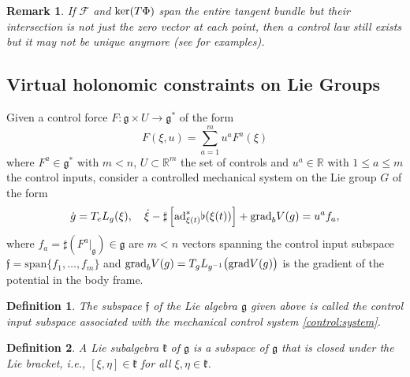 \documentclass[letterpaper, 10 pt, conference]{ieeeconf}
\newtheorem{definition}{Definition}
\newtheorem{remark}{Remark}
\newcommand{\g}{\mathfrak{g}}
\newcommand{\grad}{\normalfont{\text{grad}}}
\begin{document}
\begin{remark}
    If $\mathcal{F}$ and $\hbox{ker}(T\Phi)$ span the entire tangent bundle but their intersection is not just the zero vector at each point, then a control law still exists but it may not be unique anymore (see \cite{simoes2023virtual} for examples).
\end{remark}



\subsection{Virtual holonomic constraints on Lie Groups}\label{vclg}




Given a control force $F:\mathfrak{g}\times U \rightarrow \mathfrak{g}^{*}$ of the form
\begin{equation}\label{control:force:general}
    F(\xi,u) = \sum_{a=1}^{m} u^{a}F^{a}(\xi)
\end{equation}
where $F^{a}\in\mathfrak{g}^{*}$ with $m<n$, $U\subset\mathbb{R}^{m}$ the set of controls and $u^a\in\mathbb{R}$ with $1\leq a\leq m$ the control inputs, consider a controlled mechanical system on the Lie group $G$ of the form
\begin{equation}\label{control:system}
    \dot{g} = T_{e}L_{g}(\xi), \quad \dot{\xi} - \sharp \left[ \text{ad}^{*}_{\xi(t)}\flat(\xi(t))\right] + \grad_{b} V(g) = u^{a}f_{a},
\end{equation}
where $f_{a}=\sharp(F^a|_\g)\in \g$ are $m<n$ vectors spanning the control input subspace
$\mathfrak{f} = \text{span} \{f_{1}, \dots, f_{m}\}$ and $\grad_{b} V(g) = T_g L_{g^{-1}}\big(\grad V(g)\big)$ is the gradient of the potential in the body frame.

\begin{definition}
  The subspace $\mathfrak{f}$ of the Lie algebra $\g$ given above is called the  \textit{control input subspace} associated with the mechanical control system \eqref{control:system}. 
\end{definition}


\begin{definition}A Lie subalgebra $\mathfrak{k}$ of $\g$ is a subspace of $\g$ that is closed under the Lie bracket, i.e., $[\xi, \eta]\in \mathfrak{k}$ for all $\xi, \eta\in\mathfrak{k}$.\end{definition}
\end{document}
